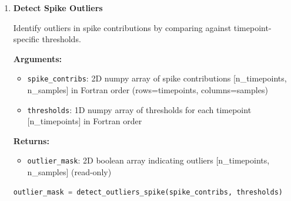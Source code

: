 \begin{enumerate}
\begin{enumerate}
\begin{itemize}
                    \item \texttt{percentile\_val}: Percentile value for threshold (0.0--100.0)
                  \end{itemize}
                  \textbf{Returns:}
                  \begin{itemize}
                    \item \texttt{thresholds}: 1D numpy array of thresholds for each timepoint
                          [n\_timepoints] (read-only)
                  \end{itemize}
                  \begin{lstlisting}[language=Python, caption={Spike Thresholds Calculation}]
thresholds = calc_spike_thresholds(spike_contribs, percentile_val)
                  \end{lstlisting}
                  
            \item \textbf{Detect Spike Outliers}
                  
                  Identify outliers in spike contributions by comparing against timepoint-specific
                  thresholds.
                  
                  \textbf{Arguments:}
                  \begin{itemize}
                    \item \texttt{spike\_contribs}: 2D numpy array of spike contributions
                          [n\_timepoints, n\_samples] in Fortran order (rows=timepoints,
                          columns=samples)
                          
                    \item \texttt{thresholds}: 1D numpy array of thresholds for each timepoint
                          [n\_timepoints] in Fortran order
                  \end{itemize}
                  \textbf{Returns:}
                  \begin{itemize}
                    \item \texttt{outlier\_mask}: 2D boolean array indicating outliers [n\_timepoints,
                    n\_samples] (read-only)
                  \end{itemize}
                  \begin{lstlisting}[language=Python, caption={Spike Outlier Detection}]
outlier_mask = detect_outliers_spike(spike_contribs, thresholds)
                  \end{lstlisting}
          \end{enumerate}
          

\end{enumerate}
